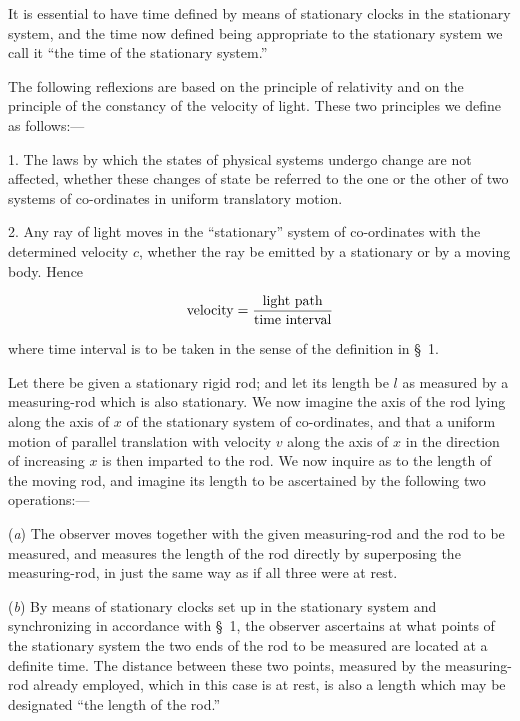 \documentclass{article}
\begin{document}
It is essential to have time defined by means of stationary clocks in
the stationary system, and the time now defined being appropriate to
the stationary system we call it ``the time of the stationary system.''


The following reflexions are based on the principle of relativity and
on the principle of the constancy of the velocity of light.  These two
principles we define as follows:---

1.  The laws by which the states of physical systems undergo change
are not affected, whether these changes of state be referred to the
one or the other of two systems of co-ordinates in uniform translatory
motion.

2.  Any ray of light moves in the ``stationary'' system of co-ordinates
with the determined velocity $c$, whether the ray be emitted by a
stationary or by a moving body.  Hence

\[
{\rm velocity}=\frac{{\rm light\ path}}{{\rm time\ interval}}
\]

\noindent
where time interval is to be taken in the sense of the definition in \S\
1.

Let there be given a stationary rigid rod; and let its length be
$l$ as measured by a measuring-rod which is also stationary.  We
now imagine the axis of the rod lying along the axis of $x$ of
the stationary system of co-ordinates, and that a uniform motion
of parallel translation with velocity $v$ along the axis of $x$
in the direction of increasing $x$ is then imparted to the rod.
We now inquire as to the length of the moving rod, and imagine
its length to be ascertained by the following two operations:---

({\em a}) The observer moves together with the given measuring-rod and the
rod to be measured, and measures the length of the rod directly by
superposing the measuring-rod, in just the same way as if all three
were at rest.

({\em b}) By means of stationary clocks set up in the stationary system and
synchronizing in accordance with \S\ 1, the observer ascertains at what
points of the stationary system the two ends of the rod to be measured
are located at a definite time.  The distance between these two
points, measured by the measuring-rod already employed, which in this
case is at rest, is also a length which may be designated ``the length
of the rod.''
\end{document}
